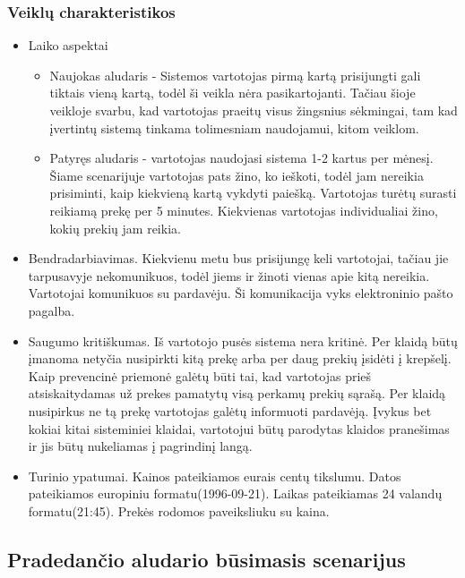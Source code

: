 \documentclass[oneside]{VUMIFPSkursinis}
\begin{document}
		\subsubsection{Veiklų charakteristikos}
				\begin{itemize}
					\item{Laiko aspektai}
						\begin{itemize}
							\item{
								Naujokas aludaris - Sistemos vartotojas pirmą kartą prisijungti gali tiktais vieną kartą, todėl ši veikla nėra pasikartojanti.
								Tačiau šioje veikloje svarbu, kad vartotojas praeitų visus žingsnius sėkmingai, tam kad įvertintų sistemą tinkama tolimesniam naudojamui, kitom veiklom.
							}
							\item{
								Patyręs aludaris - vartotojas naudojasi sistema 1-2 kartus per mėnesį.
								Šiame scenarijuje vartotojas pats žino, ko ieškoti, todėl jam nereikia prisiminti, kaip kiekvieną kartą vykdyti paiešką.
								Vartotojas turėtų surasti reikiamą prekę per 5 minutes.
								Kiekvienas vartotojas individualiai žino, kokių prekių jam reikia.
							}
						\end{itemize}
					\item{Bendradarbiavimas.}
						Kiekvienu metu bus prisijungę keli vartotojai, tačiau jie tarpusavyje nekomunikuos, todėl jiems ir žinoti vienas apie kitą nereikia.
						Vartotojai komunikuos su pardavėju.
						Ši komunikacija vyks elektroninio pašto pagalba.
					\item{Saugumo kritiškumas.}
						Iš vartotojo pusės sistema nera kritinė.
						Per klaidą būtų įmanoma netyčia nusipirkti kitą prekę arba per daug prekių įsidėti į krepšelį.
						Kaip prevencinė priemonė galėtų būti tai, kad vartotojas prieš atsiskaitydamas už prekes pamatytų visą perkamų prekių sąrašą.
						Per klaidą nusipirkus ne tą prekę vartotojas galėtų informuoti pardavėją.
						Įvykus bet kokiai kitai sisteminiei klaidai, vartotojui būtų parodytas klaidos pranešimas ir jis būtų nukeliamas į pagrindinį langą.
					\item{Turinio ypatumai.}
						Kainos pateikiamos eurais centų tikslumu.
						Datos pateikiamos europiniu formatu(1996-09-21).
						Laikas pateikiamas 24 valandų formatu(21:45).
						Prekės rodomos paveiksliuku su kaina.
				\end{itemize}
	\subsection{Pradedančio aludario būsimasis scenarijus}
\end{document}
